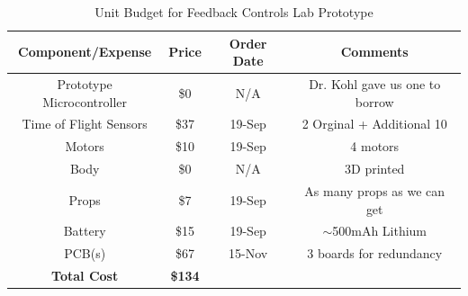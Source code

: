 \documentclass[12pt, titlepage]{article}
\begin{document}
\begin{table}[H]
\centering
\caption{Unit Budget for Feedback Controls Lab Prototype}
\label{tab:budget}
\begin{tabular}{||c|c|c|c||}
\hline 
\hline
\textbf{Component/Expense} & \textbf{Price} & \textbf{Order Date} & \textbf{Comments} \\ 
\hline 
Prototype Microcontroller & \$0 & N/A & Dr. Kohl gave us one to borrow \\
\hline 
Time of Flight Sensors & \$37 & 19-Sep & 2 Orginal + Additional 10 \\
\hline 
Motors & \$10 & 19-Sep & 4 motors \\ 
\hline 
Body & \$0 & N/A & 3D printed \\ 
\hline 
Props & \$7 & 19-Sep & As many props as we can get \\ 
\hline 
Battery & \$15 & 19-Sep & $\sim$500mAh Lithium \\ 
\hline 
PCB(s) & \$67 & 15-Nov & 3 boards for redundancy \\ 
\hline 
\textbf{Total Cost} & \textbf{\$134} &  &  \\ 
\hline 
\hline
\end{tabular} 
\end{table}
\end{document}
